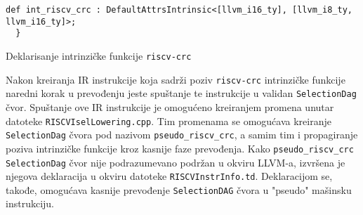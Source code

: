 \documentclass[12pt,oneside]{memoir}
\begin{document}
\begin{listing}[!ht]
\begin{verbatim}
def int_riscv_crc : DefaultAttrsIntrinsic<[llvm_i16_ty], [llvm_i8_ty, llvm_i16_ty]>;
  }
\end{verbatim}
\caption{Deklarisanje intrinzičke funkcije \texttt{riscv-crc}}
\centering
\label{riscv_crc_declaration}
\end{listing}

Nakon kreiranja IR instrukcije koja sadrži poziv \texttt{riscv-crc} intrinzičke funkcije naredni korak u prevođenju jeste spuštanje te instrukcije u validan \texttt{SelectionDag} čvor. Spuštanje ove IR instrukcije je omogućeno kreiranjem promena unutar datoteke \texttt{RISCVIselLowering.cpp}. Tim promenama se omogućava kreiranje \texttt{SelectionDag} čvora pod nazivom \texttt{pseudo\_riscv\_crc}, a samim tim i propagiranje poziva intrinzičke funkcije kroz kasnije faze prevođenja. Kako \texttt{pseudo\_riscv\_crc} \texttt{SelectionDag} čvor nije podrazumevano podržan u okviru LLVM-a, izvršena je njegova deklaracija u okviru datoteke \texttt{RISCVInstrInfo.td}. Deklaracijom se, takođe, omogućava kasnije prevođenje  \texttt{SelectionDAG} čvora u "pseudo" mašinsku instrukciju.


\end{document}
